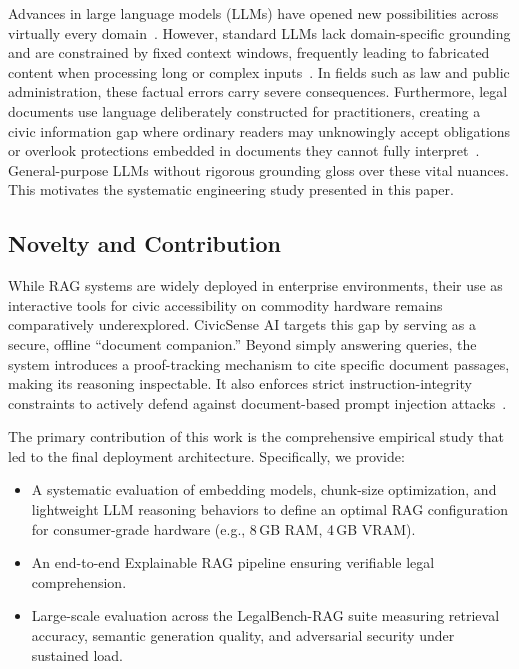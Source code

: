 \documentclass[conference]{IEEEtran}
\begin{document}
Advances in large language models (LLMs) have opened new possibilities across virtually every domain~\cite{b1,b2}. However, standard LLMs lack domain-specific grounding and are constrained by fixed context windows, frequently leading to fabricated content when processing long or complex inputs~\cite{b3,b4,b5,b6}. In fields such as law and public administration, these factual errors carry severe consequences. Furthermore, legal documents use language deliberately constructed for practitioners, creating a civic information gap where ordinary readers may unknowingly accept obligations or overlook protections embedded in documents they cannot fully interpret~\cite{b3,b10}. General-purpose LLMs without rigorous grounding gloss over these vital nuances. This motivates the systematic engineering study presented in this paper.

\subsection{Novelty and Contribution}

While RAG systems are widely deployed in enterprise environments, their use as interactive tools for civic accessibility on commodity hardware remains comparatively underexplored. CivicSense AI targets this gap by serving as a secure, offline ``document companion.'' Beyond simply answering queries, the system introduces a proof-tracking mechanism to cite specific document passages, making its reasoning inspectable. It also enforces strict instruction-integrity constraints to actively defend against document-based prompt injection attacks~\cite{b1,b5,b17}.

The primary contribution of this work is the comprehensive empirical study that led to the final deployment architecture. Specifically, we provide:
\begin{itemize}
  \item A systematic evaluation of embedding models, chunk-size optimization, and lightweight LLM reasoning behaviors to define an optimal RAG configuration for consumer-grade hardware (e.g., 8\,GB RAM, 4\,GB VRAM).
  \item An end-to-end Explainable RAG pipeline ensuring verifiable legal comprehension.
  \item Large-scale evaluation across the LegalBench-RAG suite measuring retrieval accuracy, semantic generation quality, and adversarial security under sustained load.
\end{itemize}
\end{document}
